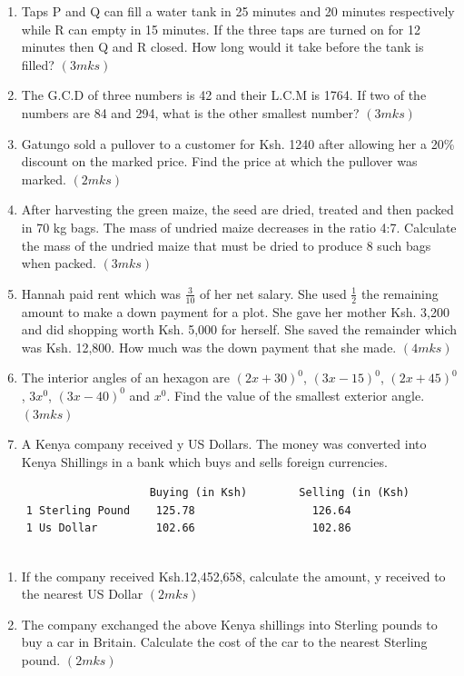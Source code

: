 \documentclass[
  a4paperpaper,
]{scrbook}
\begin{document}
\begin{tcolorbox}
\begin{enumerate}
\def\labelenumi{\arabic{enumi}.}
\setcounter{enumi}{3}
\item
  Taps P and Q can fill a water tank in 25 minutes and 20 minutes
  respectively while R can empty in 15 minutes. If the three taps are
  turned on for 12 minutes then Q and R closed. How long would it take
  before the tank is filled? \((3 mks)\)
\item
  The G.C.D of three numbers is 42 and their L.C.M is 1764. If two of
  the numbers are 84 and 294, what is the other smallest number?
  \((3 mks)\)
\item
  Gatungo sold a pullover to a customer for Ksh. 1240 after allowing her
  a 20\% discount on the marked price. Find the price at which the
  pullover was marked. \((2mks)\)
\item
  After harvesting the green maize, the seed are dried, treated and then
  packed in 70 kg bags. The mass of undried maize decreases in the ratio
  4:7. Calculate the mass of the undried maize that must be dried to
  produce 8 such bags when packed. \((3mks)\)
\item
  Hannah paid rent which was \(\frac{3}{10}\) of her net salary. She
  used \(\frac{1}{2}\) the remaining amount to make a down payment for a
  plot. She gave her mother Ksh. 3,200 and did shopping worth Ksh. 5,000
  for herself. She saved the remainder which was Ksh. 12,800. How much
  was the down payment that she made. \((4mks)\)
\item
  The interior angles of an hexagon are \((2x + 30)^0\),
  \((3x - 15)^0\), \((2x + 45)^0\), \(3x^0\), \((3x - 40)^0\) and
  \(x^0\). Find the value of the smallest exterior angle. \((3mks)\)
\item
  A Kenya company received y US Dollars. The money was converted into
  Kenya Shillings in a bank which buys and sells foreign currencies.
\end{enumerate}

\begin{verbatim}
                       Buying (in Ksh)        Selling (in (Ksh)
    1 Sterling Pound    125.78                  126.64 
    1 Us Dollar         102.66                  102.86
  
\end{verbatim}

\begin{enumerate}
\def\labelenumi{\alph{enumi})}
\item
  If the company received Ksh.12,452,658, calculate the amount, y
  received to the nearest US Dollar \((2mks)\)
\item
  The company exchanged the above Kenya shillings into Sterling pounds
  to buy a car in Britain. Calculate the cost of the car to the nearest
  Sterling pound. \((2mks)\)
\end{enumerate}


\end{tcolorbox}
\end{document}
